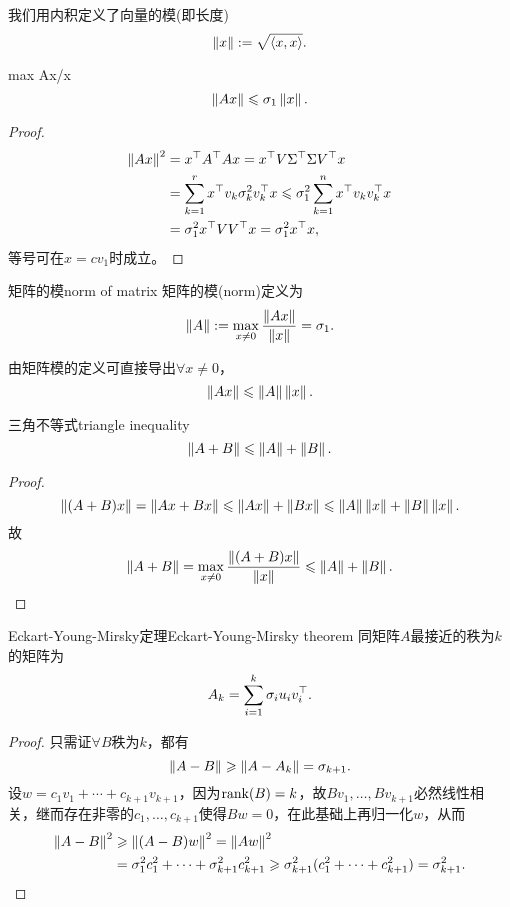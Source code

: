 我们用内积定义了向量的模(即长度)
\[
	\left\lVert x\right\rVert:=\sqrt{\left\langle x,x\right\rangle}.
\]
\begin{theorem}{}{max Ax/x}
	\begin{equation}
		\left\lVert Ax\right\rVert\leqslant\sigma_1\left\lVert x\right\rVert.
	\end{equation}
\end{theorem}
\begin{proof}
	
	\begin{align*}
		\left\lVert Ax\right\rVert^2&=x^\top A^\top Ax=x^\top V\Sigma^\top\Sigma V^\top x\\
		&=\sum_{k=1}^rx^\top v_k\sigma_k^2v_k^\top x\leqslant\sigma_1^2\sum_{k=1}^nx^\top v_kv_k^\top x\\
		&=\sigma_1^2x^\top VV^\top x=\sigma_1^2x^\top x,
	\end{align*}
	等号可在$x=cv_1$时成立。
\end{proof}
\begin{definition}{矩阵的模}{norm of matrix}
	矩阵的模(norm)定义为 
	\begin{equation}
		\left\lVert A\right\rVert:=\max_{x\neq 0}\frac{\left\lVert Ax\right\rVert}{\left\lVert x\right\rVert}=\sigma_1.
	\end{equation}
\end{definition}
由矩阵模的定义可直接导出$\forall x\neq 0$，
\[
	\left\lVert Ax\right\rVert\leqslant\left\lVert A\right\rVert\left\lVert x\right\rVert.
\]
\begin{theorem}{三角不等式}{triangle inequality}
	\begin{equation}
		\left\lVert A+B\right\rVert\leqslant\left\lVert A\right\rVert+\left\lVert B\right\rVert.
	\end{equation}
\end{theorem}
\begin{proof}
	
	\[
		\left\lVert(A+B)x\right\rVert=\left\lVert Ax+Bx\right\rVert\leqslant\left\lVert Ax\right\rVert+\left\lVert Bx\right\rVert\leqslant\left\lVert A\right\rVert\left\lVert x\right\rVert+\left\lVert B\right\rVert\left\lVert x\right\rVert.
	\]
	故
	\[
		\left\lVert A+B\right\rVert=\max_{x\neq 0}\frac{\left\lVert(A+B)x\right\rVert}{\left\lVert x\right\rVert}\leqslant\left\lVert A\right\rVert+\left\lVert B\right\rVert.
	\]
\end{proof}
\begin{theorem}{Eckart-Young-Mirsky定理}{Eckart-Young-Mirsky theorem}
	同矩阵$A$最接近的秩为$k$的矩阵为
	\begin{equation}
		A_k=\sum_{i=1}^k\sigma_iu_iv_i^\top.
	\end{equation}
\end{theorem}
\begin{proof}
	只需证$\forall B$秩为$k$，都有
	\[
		\left\lVert A-B\right\rVert\geqslant\left\lVert A-A_k\right\rVert=\sigma_{k+1}.
	\]
	设$w=c_1v_1+\cdots+c_{k+1}v_{k+1}$，因为$\operatorname{rank}(B)=k$，故$Bv_1,\ldots,Bv_{k+1}$必然线性相关，继而存在非零的$c_1,\ldots,c_{k+1}$使得$Bw=0$，在此基础上再归一化$w$，从而
	\begin{align*}
		\left\lVert A-B\right\rVert^2&\geqslant\left\lVert(A-B)w\right\rVert^2=\left\lVert Aw\right\rVert^2\\
		&=\sigma_1^2c_1^2+\cdots+\sigma_{k+1}^2c_{k+1}^2\geqslant\sigma_{k+1}^2(c_1^2+\cdots+c_{k+1}^2)=\sigma_{k+1}^2.
	\end{align*}
\end{proof}
